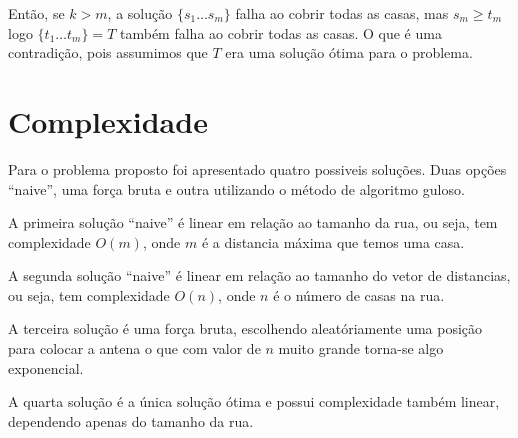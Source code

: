 \documentclass[11pt]{article}
\begin{document}
Então, se $k>m$, a solução $\{ s_1 \ldots s_m \}$ falha ao cobrir todas as casas, mas $s_m \geq t_m$ logo $\{ t_1 \ldots t_m \} = T$
também falha ao cobrir todas as casas. O que é uma contradição, pois assumimos que $T$ era uma solução ótima para o problema.


\section{Complexidade}
\label{sec-5}

Para o problema proposto foi apresentado quatro possiveis soluções. Duas opções ``naive'', uma força bruta e outra utilizando o 
método de algoritmo guloso.

A primeira solução ``naive'' é linear em relação ao tamanho da rua, ou seja, tem complexidade $O(m)$, onde $m$ é a distancia máxima 
que temos uma casa.

A segunda solução ``naive'' é linear em relação ao tamanho do vetor de distancias, ou seja, tem complexidade $O(n)$, onde $n$ é o número
de casas na rua.

A terceira solução é uma força bruta, escolhendo aleatóriamente uma posição para colocar a antena o que com valor de $n$ muito grande 
torna-se algo exponencial.

A quarta solução é a única solução ótima e possui complexidade também linear, dependendo apenas do tamanho da rua.
\end{document}

